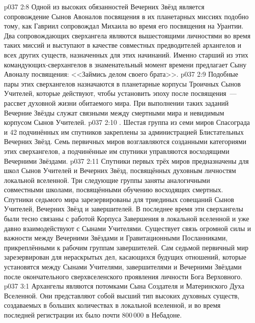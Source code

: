 \vs p037 2:8 Одной из высоких обязанностей Вечерних Звёзд является сопровождение Сынов Авоналов посвящения в их планетарных миссиях подобно тому, как Гавриил сопровождал Михаила во время его посвящения на Урантии. Два сопровождающих сверхангела являются вышестоящими личностями во время таких миссий и выступают в качестве совместных предводителей архангелов и всех других существ, назначенных для этих начинаний. Именно старший из этих командующих\hyp{}сверхангелов в знаменательный момент времени предлагает Сыну Авоналу посвящения: <<Займись делом своего брата>>.
\vs p037 2:9 Подобные пары этих сверхангелов назначаются в планетарные корпусы Троичных Сынов Учителей, которые действуют, чтобы установить эпоху после посвящения~--- рассвет духовной жизни обитаемого мира. При выполнении таких заданий Вечерние Звёзды служат связными между смертными мира и невидимым корпусом Сынов Учителей.
\vs p037 2:10 \pc {}. Шестая группа из семи миров Спасограда и 42 подчинённых им спутников закреплены за администрацией Блистательных Вечерних Звёзд. Семь первичных миров возглавляются созданными категориями этих сверхангелов, а подчинённые им спутники управляются восходящими Вечерними Звёздами.
\vs p037 2:11 Спутники первых трёх миров предназначены для школ Сынов Учителей и Вечерних Звёзд, посвящённых духовным личностям локальной вселенной. Три следующие группы заняты аналогичными совместными школами, посвящёнными обучению восходящих смертных. Спутники седьмого мира зарезервированы для триединых совещаний Сынов Учителей, Вечерних Звёзд и завершителей. В последнее время эти сверхангелы были тесно связаны с работой Корпуса Завершения в локальной вселенной и уже давно взаимодействуют с Сынами Учителями. Существует связь огромной силы и важности между Вечерними Звёздами и Гравитационными Посланниками, прикреплёнными к рабочим группам завершителей. Сам седьмой первичный мир зарезервирован для нераскрытых дел, касающихся будущих отношений, которые установятся между Сынами Учителями, завершителями и Вечерними Звёздами после окончательного сверхвселенского проявления личности Бога Верховного.
\vs p037 3:1 Архангелы являются потомками Сына Создателя и Материнского Духа Вселенной. Они представляют собой высший тип высоких духовных существ, создаваемых в больших количествах в локальной вселенной, и во время последней регистрации их было почти 800\,000 в Небадоне.
